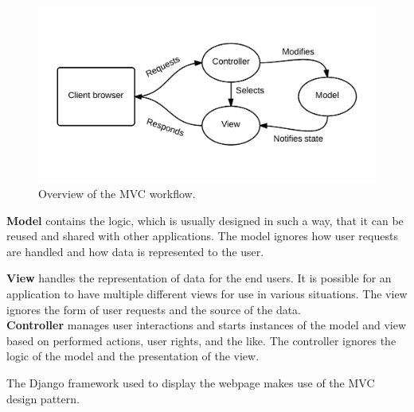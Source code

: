 \begin{figure}[ht]
\includegraphics[width=\textwidth]{img/mvc.png}
\caption{Overview of the MVC workflow.}
\label{fig:mvc}
\end{figure}

\textbf{Model} contains the logic, which is usually designed in such a way, that it can be reused and shared with other applications.
The model ignores how user requests are handled and how data is represented to the user.\newline

\textbf{View} handles the representation of data for the end users.
It is possible for an application to have multiple different views for use in various situations.
The view ignores the form of user requests and the source of the data.\\

\textbf{Controller} manages user interactions and starts instances of the model and view based on performed actions, user rights, and the like.
The controller ignores the logic of the model and the presentation of the view.\newline

The Django framework used to display the webpage makes use of the MVC design pattern.